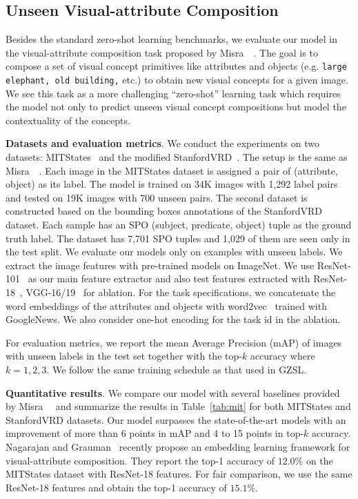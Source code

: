 \documentclass[10pt,twocolumn,letterpaper]{article}
\newcommand\minisection[1]{\vspace{2mm}\noindent \textbf{#1}}
\begin{document}
\subsection{Unseen Visual-attribute Composition}
Besides the standard zero-shot learning benchmarks, we evaluate our model in the visual-attribute composition task proposed by Misra~\etal~\cite{misra2017red}. The goal is to compose a set of visual concept primitives like attributes 
and objects (e.g. \texttt{large elephant, old building,} etc.) to obtain new visual concepts for a given image. We see this task as a more challenging ``zero-shot'' learning task which requires the model not only to predict unseen visual concept compositions but model the contextuality of the concepts. 

\minisection{Datasets and evaluation metrics}. We conduct the experiments on two
datasets: MITStates~\cite{StatesAndTransformations} and
the modified StanfordVRD~\cite{lu2016visual}. The setup is the same as Misra~\etal~\cite{misra2017red}.
Each image in the MITStates dataset is assigned a pair of (attribute, object) as
its label. The model is trained on 34K images with 1,292 label pairs and tested on
19K images with 700 unseen pairs. The second dataset is constructed based on 
the bounding boxes annotations of the StanfordVRD dataset. Each sample has an SPO (subject, predicate, object)
tuple as the ground truth label.  The dataset has 7,701 SPO tuples and 1,029 of them
are seen only in the test split. We evaluate our models only on examples with unseen
labels. We extract the image features with
pre-trained models on ImageNet. We use ResNet-101~\cite{he2016deep} as our main
feature extractor and also test features extracted 
with ResNet-18~\cite{he2016deep}, VGG-16/19~\cite{simonyan2014very} for ablation. 
For the task specifications, we concatenate the word embeddings of the attributes
and objects with word2vec~\cite{mikolov2013efficient} trained with GoogleNews. We
also consider one-hot encoding for the task id in the ablation. 

For evaluation metrics, we report the mean Average Precision (mAP) of images 
with unseen labels in the test set together with the top-$k$ accuracy where
$k=1,2,3$. We follow the same training schedule as that used in GZSL.

\minisection{Quantitative results}. We compare our model with
several baselines provided by Misra~\etal~\cite{misra2017red} and
summarize the results in
Table~\ref{tab:mit} for both MITStates and StanfordVRD
datasets. Our model surpasses the state-of-the-art models
with an improvement
of more than 6 points in mAP and 4 to 15 points in top-$k$
accuracy. Nagarajan and Grauman~\cite{nagarajan2018attrop}
recently propose an embedding learning framework for visual-attribute composition. They report the top-1 
accuracy of $12.0\%$ on the MITStates dataset with
ResNet-18 features. For fair
comparison, we use the same ResNet-18 features and obtain
the top-1 accuracy of $15.1\%$. 
\end{document}
